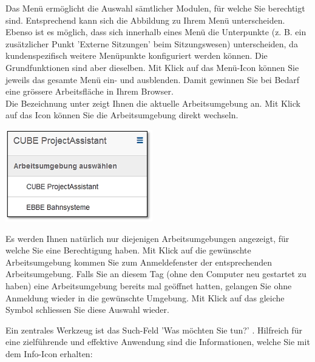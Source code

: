 Das Menü ermöglicht die Auswahl sämtlicher Modulen, für welche Sie berechtigt sind. Entsprechend kann sich die Abbildung zu Ihrem Menü unterscheiden. Ebenso ist es möglich, dass sich innerhalb eines Menü die Unterpunkte (z. B. ein zusätzlicher Punkt 'Externe Sitzungen' beim Sitzungswesen) unterscheiden, da kundenspezifisch weitere Menüpunkte konfiguriert werden können. Die Grundfunktionen sind aber dieselben. Mit Klick auf das Menü-Icon  können Sie jeweils das gesamte Menü ein- und ausblenden. Damit gewinnen Sie bei Bedarf eine grössere Arbeitsfläche in Ihrem Browser. \\
Die Bezeichnung unter  zeigt Ihnen die aktuelle Arbeitsumgebung an. Mit Klick auf das Icon  können Sie die Arbeitsumgebung direkt wechseln. 

\vspace{\baselineskip}

\begin{raggedleft}
\hspace{80mm} \includegraphics[height=40mm]{../chapters/02_GettingStarted/pictures/2-5-1_Arbeitsumgebung_wechseln.jpg}
\end{raggedleft}

\vspace{\baselineskip}

Es werden Ihnen natürlich nur diejenigen Arbeitsumgebungen angezeigt, für welche Sie eine Berechtigung haben. Mit Klick auf die gewünschte Arbeitsumgebung kommen Sie zum Anmeldefenster der entsprechenden Arbeitsumgebung. Falls Sie an diesem Tag (ohne den Computer neu gestartet zu haben) eine Arbeitsumgebung bereits mal geöffnet hatten, gelangen Sie ohne Anmeldung wieder in die gewünschte Umgebung. Mit Klick auf das gleiche Symbol  schliessen Sie diese Auswahl wieder. 

\vspace{\baselineskip}

Ein zentrales Werkzeug ist das Such-Feld 'Was möchten Sie tun?' . Hilfreich für eine zielführende und effektive Anwendung sind die Informationen, welche Sie mit dem Info-Icon  erhalten:

